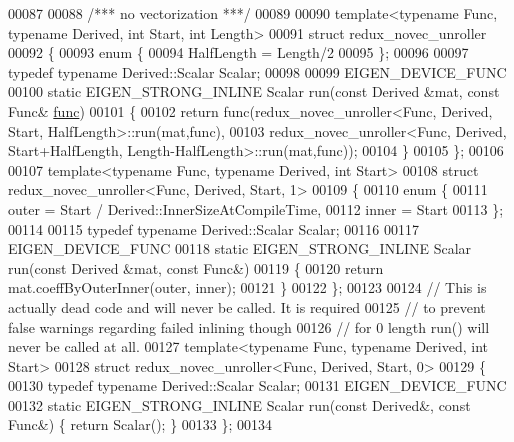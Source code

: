 \begin{DoxyCode}
00087 
00088 \textcolor{comment}{/*** no vectorization ***/}
00089 
00090 \textcolor{keyword}{template}<\textcolor{keyword}{typename} Func, \textcolor{keyword}{typename} Derived, \textcolor{keywordtype}{int} Start, \textcolor{keywordtype}{int} Length>
00091 \textcolor{keyword}{struct }redux\_novec\_unroller
00092 \{
00093   \textcolor{keyword}{enum} \{
00094     HalfLength = Length/2
00095   \};
00096 
00097   \textcolor{keyword}{typedef} \textcolor{keyword}{typename} Derived::Scalar Scalar;
00098 
00099   EIGEN\_DEVICE\_FUNC
00100   \textcolor{keyword}{static} EIGEN\_STRONG\_INLINE Scalar run(\textcolor{keyword}{const} Derived &mat, \textcolor{keyword}{const} Func& \hyperlink{structfunc}{func})
00101   \{
00102     \textcolor{keywordflow}{return} func(redux\_novec\_unroller<Func, Derived, Start, HalfLength>::run(mat,func),
00103                 redux\_novec\_unroller<Func, Derived, Start+HalfLength, Length-HalfLength>::run(mat,func));
00104   \}
00105 \};
00106 
00107 \textcolor{keyword}{template}<\textcolor{keyword}{typename} Func, \textcolor{keyword}{typename} Derived, \textcolor{keywordtype}{int} Start>
00108 \textcolor{keyword}{struct }redux\_novec\_unroller<Func, Derived, Start, 1>
00109 \{
00110   \textcolor{keyword}{enum} \{
00111     outer = Start / Derived::InnerSizeAtCompileTime,
00112     inner = Start %
00113   \};
00114 
00115   \textcolor{keyword}{typedef} \textcolor{keyword}{typename} Derived::Scalar Scalar;
00116 
00117   EIGEN\_DEVICE\_FUNC
00118   \textcolor{keyword}{static} EIGEN\_STRONG\_INLINE Scalar run(\textcolor{keyword}{const} Derived &mat, \textcolor{keyword}{const} Func&)
00119   \{
00120     \textcolor{keywordflow}{return} mat.coeffByOuterInner(outer, inner);
00121   \}
00122 \};
00123 
00124 \textcolor{comment}{// This is actually dead code and will never be called. It is required}
00125 \textcolor{comment}{// to prevent false warnings regarding failed inlining though}
00126 \textcolor{comment}{// for 0 length run() will never be called at all.}
00127 \textcolor{keyword}{template}<\textcolor{keyword}{typename} Func, \textcolor{keyword}{typename} Derived, \textcolor{keywordtype}{int} Start>
00128 \textcolor{keyword}{struct }redux\_novec\_unroller<Func, Derived, Start, 0>
00129 \{
00130   \textcolor{keyword}{typedef} \textcolor{keyword}{typename} Derived::Scalar Scalar;
00131   EIGEN\_DEVICE\_FUNC 
00132   \textcolor{keyword}{static} EIGEN\_STRONG\_INLINE Scalar run(\textcolor{keyword}{const} Derived&, \textcolor{keyword}{const} Func&) \{ \textcolor{keywordflow}{return} Scalar(); \}
00133 \};
00134 

\end{DoxyCode}
